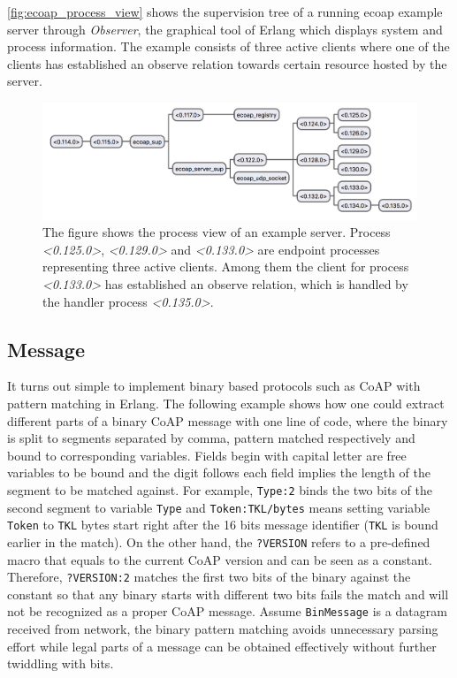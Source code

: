 \autoref{fig:ecoap_process_view} shows the supervision tree of a running ecoap example server through \textit{Observer}, the graphical tool of Erlang which displays system and process information. The example consists of three active clients where one of the clients has established an observe relation towards certain resource hosted by the server. 

\begin{figure}[!htbp]
\centering
\includegraphics[scale = 0.6]{ecoap_process_view}
\caption[Process view of an example server]{The figure shows the process view of an example server. Process \textit{<0.125.0>},  \textit{<0.129.0>} and \textit{<0.133.0>} are endpoint processes representing three active clients. Among them the client for process \textit{<0.133.0>} has established an observe relation, which is handled by the handler process \textit{<0.135.0>}.}
\label{fig:ecoap_process_view}
\end{figure}

\subsection{Message}

It turns out simple to implement binary based protocols such as CoAP with pattern matching in Erlang. The following example shows how one could extract different parts of a binary CoAP message with one line of code, where the binary is split to segments separated by comma, pattern matched respectively and bound to corresponding variables. Fields begin with capital letter are free variables to be bound and the digit follows each field implies the length of the segment to be matched against. For example, \verb|Type:2| binds the two bits of the second segment to variable \verb|Type| and \verb|Token:TKL/bytes| means setting variable \verb|Token| to \verb|TKL| bytes start right after the 16 bits message identifier (\verb|TKL| is bound earlier in the match). On the other hand, the \verb|?VERSION| refers to a pre-defined macro that equals to the current CoAP version and can be seen as a constant. Therefore, \verb|?VERSION:2| matches the first two bits of the binary against the constant so that any binary starts with different two bits fails the match and will not be recognized as a proper CoAP message. Assume \verb|BinMessage| is a datagram received from network, the binary pattern matching avoids unnecessary parsing effort while legal parts of a message can be obtained effectively without further twiddling with bits. 

